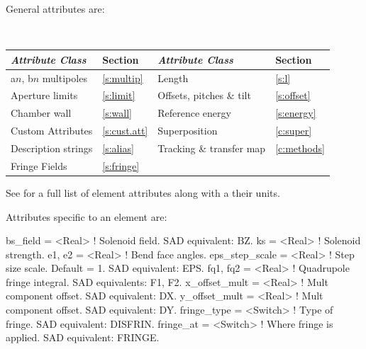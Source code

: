 {General  attributes are:
\begin{center}
\tt
\begin{tabular}{llll} \toprule
  {\sl Attribute Class}      & Section           & {\sl Attribute Class}      & Section         \\ \midrule
  a$n$, b$n$ multipoles      & \ref{s:multip}    & Length                     & \ref{s:l}       \\
  Aperture limits            & \ref{s:limit}     & Offsets, pitches \& tilt   & \ref{s:offset}  \\
  Chamber wall               & \ref{s:wall}      & Reference energy           & \ref{s:energy}  \\ 
  Custom Attributes          & \ref{s:cust.att}  & Superposition              & \ref{c:super}   \\
  Description strings        & \ref{s:alias}     & Tracking \& transfer map   & \ref{c:methods} \\ 
  Fringe Fields              & \ref{s:fringe}    &                            &                 \\
  \bottomrule
\end{tabular}
\end{center}
\toffset
See  for a full list of element attributes along with a their units.

Attributes specific to an  element are:
\begin{example}
  bs_field        = <Real>    ! Solenoid field. SAD equivalent: BZ.
  ks              = <Real>    ! Solenoid strength. 
  e1, e2          = <Real>    ! Bend face angles.
  eps_step_scale  = <Real>    ! Step size scale. Default = 1. SAD equivalent: EPS.
  fq1, fq2        = <Real>    ! Quadrupole fringe integral. SAD equivalents: F1, F2.
  x_offset_mult   = <Real>    ! Mult component offset. SAD equivalent: DX.
  y_offset_mult   = <Real>    ! Mult component offset. SAD equivalent: DY.
  fringe_type     = <Switch>  ! Type of fringe. SAD equivalent: DISFRIN.
  fringe_at       = <Switch>  ! Where fringe is applied. SAD equivalent: FRINGE.
\end{example}


}
